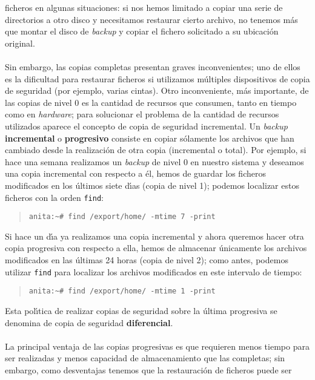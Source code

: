 ficheros en algunas situaciones: si nos hemos limitado a copiar una serie de 
directorios a otro disco
y necesitamos restaurar cierto archivo, no tenemos m\'as que montar el disco
de {\it backup} y copiar el fichero solicitado a su ubicaci\'on original.\\
\\Sin embargo, las copias completas presentan graves inconvenientes; uno de 
ellos es la dificultad para restaurar ficheros si utilizamos m\'ultiples 
dispositivos de copia de seguridad (por ejemplo, varias cintas). Otro 
inconveniente, m\'as importante, de las copias de nivel 0 es la cantidad de 
recursos que consumen, tanto en tiempo como en {\it hardware}; para solucionar
el problema de la cantidad de recursos utilizados aparece el concepto de
copia de seguridad incremental. Un {\it backup} {\bf incremental} o {\bf 
progresivo} consiste en
copiar s\'olamente los archivos que han cambiado desde la realizaci\'on de 
otra copia (incremental o total). Por ejemplo, si hace una semana realizamos un
{\it backup} de nivel 0 en nuestro sistema y deseamos una copia incremental
con respecto a \'el, hemos de guardar los ficheros modificados en los \'ultimos
siete d\'{\i}as (copia de nivel 1); podemos localizar estos ficheros con 
la orden {\tt find}:
\tt
\begin{quote}
\begin{verbatim}
anita:~# find /export/home/ -mtime 7 -print
\end{verbatim}
\end{quote}
\rm
Si hace un d\'{\i}a ya realizamos una 
copia incremental y ahora queremos hacer otra copia progresiva con respecto a 
ella, hemos de almacenar \'unicamente los archivos modificados en las \'ultimas 
24 horas (copia de nivel 2); como antes, podemos utilizar {\tt find} para 
localizar los archivos modificados en este intervalo de tiempo:
\tt
\begin{quote}
\begin{verbatim}
anita:~# find /export/home/ -mtime 1 -print
\end{verbatim}
\end{quote}
\rm
Esta pol\'{\i}tica de realizar copias de seguridad sobre la \'ultima progresiva 
se denomina de copia de seguridad {\bf diferencial}.\\
\\La principal ventaja de las copias progresivas es que requieren menos tiempo
para ser realizadas y menos capacidad de almacenamiento que las completas; sin
embargo, como desventajas tenemos que la restauraci\'on de ficheros puede ser
